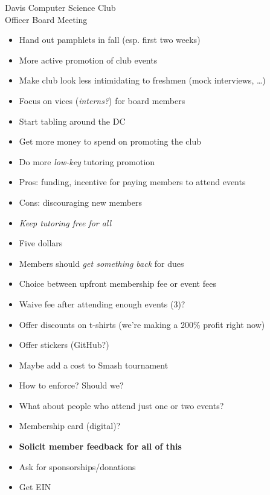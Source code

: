 \documentclass{article}
\begin{document}
\begin{Minutes}{Davis Computer Science Club\\Officer Board Meeting}
\begin{itemize}
\item Hand out pamphlets in fall (esp. first two weeks)
\item More active promotion of club events
\item Make club look less intimidating to freshmen (mock interviews, \dots)
\item Focus on vices (\textit{interns?}) for board members
\item Start tabling around the DC
\item Get more money to spend on promoting the club
\item Do more \textit{low-key} tutoring promotion
\end{itemize}

\begin{itemize}
\item Pros: funding, incentive for paying members to attend events
\item Cons: discouraging new members
\item \textit{Keep tutoring free for all}
\item Five dollars
\item Members should \textit{get something back} for dues
\item Choice between upfront membership fee or event fees
\item Waive fee after attending enough events (3)?
\item Offer discounts on t-shirts (we're making a 200\% profit right now)
\item Offer stickers (GitHub?)
\item Maybe add a cost to Smash tournament
\item How to enforce?  Should we?
\item What about people who attend just one or two events?
\item Membership card (digital)?
\item \textbf{Solicit member feedback for all of this}
\item Ask for sponsorships/donations
\item Get EIN
\end{itemize}
\thispagestyle{creditfooter}
\end{Minutes}
\end{document}
